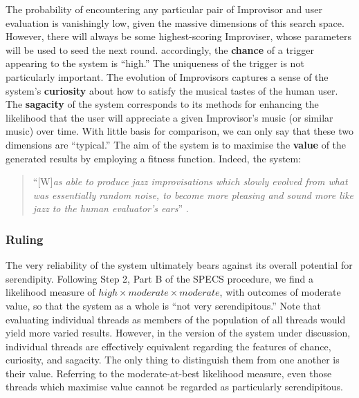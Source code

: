 The probability of encountering any particular pair of Improvisor and
user evaluation is vanishingly low, given the massive dimensions of
this search space.  However, there will always be some highest-scoring
Improviser, whose parameters will be used to seed the next round.
accordingly, the \textbf{chance} of a trigger appearing to the
system is ``high.''  The uniqueness of the trigger is not particularly
important.  The evolution of Improvisors captures a sense of the
system's \textbf{curiosity} about how to satisfy the musical tastes of
the human user.  The \textbf{sagacity} of the system corresponds to its
methods for enhancing the likelihood that the user will appreciate a
given Improvisor's music (or similar music) over time.  With little
basis for comparison, we can only say that these two dimensions are
``typical.''  The aim of the system is to maximise the \textbf{value}
of the generated results by employing a fitness function.  Indeed,
the system:
\begin{quote}
``{[}W{]}\emph{as able to produce jazz improvisations which slowly
    evolved from what was essentially random noise, to become more
    pleasing and sound more like jazz to the human evaluator's ears}''
  \cite{jordanous10}.
\end{quote}

\subsubsection{Ruling}
The very reliability of the system ultimately bears against its
overall potential for serendipity.  Following Step 2, Part B of the
SPECS procedure, we find a likelihood measure of
$\mathit{high}\times\mathit{moderate}\times\mathit{moderate}$, with
outcomes of moderate value, so that the system as a whole is ``not
very serendipitous.''  Note that evaluating individual threads as
members of the population of all threads would yield more varied
results.  However, in the version of the system under discussion,
individual threads are effectively equivalent regarding the features
of chance, curiosity, and sagacity.  The only thing to distinguish
them from one another is their value.  Referring to the
moderate-at-best likelihood measure, even those threads which maximise
value cannot be regarded as particularly serendipitous.

